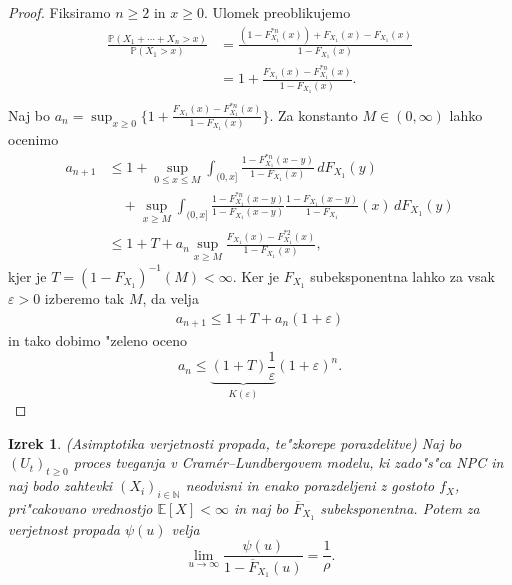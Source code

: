 \documentclass[12pt, a4paper, reqno]{amsart}
\theoremstyle{definition}
\theoremstyle{plain}
\newtheorem{izrek}[definicija]{Izrek}
\newcommand{\N}{\mathbb{N}}
\newcommand{\E}{\mathbb{E}}
\newcommand{\Prob}{\mathbb{P}}
\newcommand{\1}{\mathds{1}}
\begin{document}
        \begin{proof}
            Fiksiramo $n\geq2$ in $x\geq0$. Ulomek preoblikujemo
            \begin{align*}
                \frac{\Prob(X_1 + \cdots + X_n > x)}{\Prob(X_1 > x)} 
                &= \frac{(1 - F_{X_1}^{*n}(x)) + F_{X_1}(x) - F_{X_1}(x)}{1 - F_{X_1}(x)} \\
                &= 1 + \frac{F_{X_1}(x) - F_{X_1}^{*n}(x)}{1 - F_{X_1}(x)}. \\
            \end{align*}
            Naj bo $a_n = \sup_{x\geq0}\biggl\{ 1 + \frac{F_{X_1}(x) - F_{X_1}^{*n}(x)}{1 - F_{X_1}(x)}\biggr\}.$ Za 
            konstanto $M\in(0, \infty)$ lahko ocenimo
            \begin{align*}
                a_{n+1} &\leq 1 + \sup_{0\leq x\leq M}\int_{(0,x]}\frac{1 - F_{X_1}^{*n}(x - y)}{1 - F_{X_1}(x)}\, dF_{X_1}(y) \\
                            & \quad + \sup_{x\geq M}\int_{(0, x]}\frac{1 - F_{X_1}^{*n}(x - y)}{1 - F_{X_1}(x - y)}\frac{1 - F_{X_1}(x - y)}{1 - F_{X_1}}(x) \, dF_{X_1}(y) \\
                        &\leq 1 + T + a_n\sup_{x\geq M}\frac{F_{X_1}(x) - F_{X_1}^{*2}(x)}{1 - F_{X_1}(x)},
            \end{align*}
            kjer je $T = (1 - F_{X_1})^{-1}(M) < \infty$. Ker je $F_{X_1}$ subeksponentna lahko 
            za vsak $\varepsilon > 0$ izberemo tak $M$, da velja
            \begin{align*}
                a_{n+1} \leq 1 + T + a_n(1 + \varepsilon)
            \end{align*}
            in tako dobimo "zeleno oceno
            \begin{equation*}
                a_n \leq \underbrace{(1 + T)\frac{1}{\varepsilon}}_{K(\varepsilon)}(1 + \varepsilon)^n.
            \end{equation*}
        \end{proof}
        
        \begin{izrek}(Asimptotika verjetnosti propada, te"zkorepe porazdelitve)
            Naj bo $(U_t)_{t\geq0}$ proces tveganja v Cramér--Lundbergovem modelu, ki zado"s"ca NPC in 
            naj bodo zahtevki $(X_i)_{i\in\N}$ neodvisni in enako porazdeljeni z gostoto $f_X$, 
            pri"cakovano vrednostjo $\E\left[X\right] < \infty$ in naj bo $\overline{F}_{X_1}$ subeksponentna.
            Potem za verjetnost propada $\psi(u)$ velja
            \begin{equation}
                \lim_{u\to\infty}\frac{\psi(u)}{1 - \overline{F}_{X_1}(u)} = \frac{1}{\rho}.
                \label{eq:tezkorepnePorazdelitveAsimptotika}
            \end{equation}
            \label{izr:tezkorepnePorazdelitveAsimptotika}
        \end{izrek}
\end{document}
